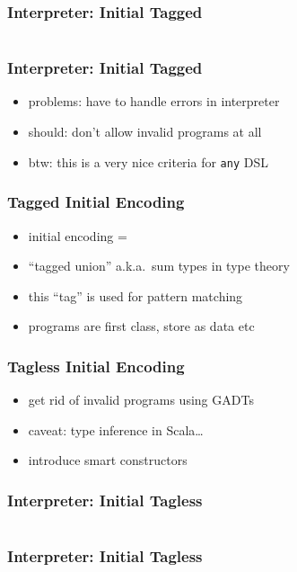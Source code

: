 \documentclass[aspectratio=169, hyperref={colorlinks, linkcolor=beamer@centricgreen}, urlcolor=links]{beamer}
\begin{document}
\begin{frame}
  \frametitle{Interpreter: Initial Tagged}
  \inputminted[fontsize=\footnotesize]{scala}{snippets/initial-tagged-add.scala}
\end{frame}

\begin{frame}
  \frametitle{Interpreter: Initial Tagged}
  \begin{itemize}
  \item problems: have to handle errors in interpreter
  \item should: don't allow invalid programs at all
  \item btw: this is a very nice criteria for \texttt{any} DSL
  \end{itemize}
\end{frame}

\begin{frame}
  \frametitle{Tagged Initial Encoding}
  \begin{itemize}
  \item initial encoding =
  \item ``tagged union'' a.k.a.\ sum types in type theory
  \item this ``tag'' is used for pattern matching
  \item programs are first class, store as data etc
  \end{itemize}
\end{frame}

\begin{frame}
  \frametitle{Tagless Initial Encoding}
  \begin{itemize}
  \item get rid of invalid programs using GADTs
  \item caveat: type inference in Scala\ldots{}
  \item introduce smart constructors
  \end{itemize}
\end{frame}

\begin{frame}
  \frametitle{Interpreter: Initial Tagless}
  \inputminted[fontsize=\footnotesize]{scala}{snippets/initial-tagless-expr.scala}
\end{frame}

\begin{frame}
  \frametitle{Interpreter: Initial Tagless}
  \inputminted[fontsize=\footnotesize]{scala}{snippets/initial-tagless-sample.scala}
\end{frame}
\end{document}
